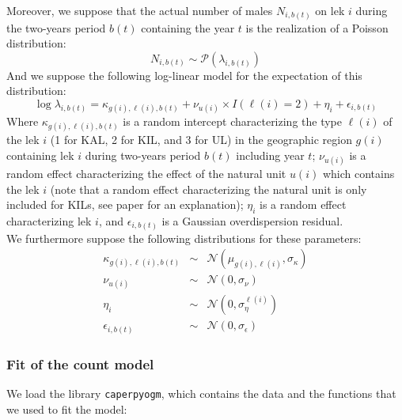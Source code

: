 \documentclass[a4paper]{article}
\newenvironment{Default Paragraph Font}{}{}
\begin{document}
Moreover, we suppose that the actual number of males $N_{i,b(t)}$ on
lek $i$ during the two-years period $b(t)$  containing the year $t$ is
the realization of a Poisson distribution:
\begin{equation}
  \label{eq:eqN}
  N_{i,b(t)}\sim \mathcal{P}(\lambda_{i,b(t)})
\end{equation}
And we suppose the following log-linear model for the expectation of
this distribution:
\begin{equation}
  \label{eq:eqlambda}
\log \lambda_{i,b(t)} = \kappa_{g(i),\ell(i),b(t)} + \nu_{u(i)}\times
I(\ell(i) =2) + \eta_i + \epsilon_{i,b(t)}
\end{equation}
Where $\kappa_{g(i),\ell(i),b(t)}$ is a random intercept
characterizing the type $\ell(i)$ of the lek $i$ (1 for KAL, 2 for
KIL, and 3 for UL) in the geographic region $g(i)$ containing lek $i$
during two-years period $b(t)$ including year $t$; $\nu_{u(i)}$ is a
random effect characterizing the effect of the natural unit $u(i)$
which contains the lek $i$ (note that a random effect characterizing
the natural unit is only included for KILs, see paper for an
explanation); $\eta_i$ is a random effect characterizing lek $i$, and
$\epsilon_{i,b(t)}$ is a Gaussian overdispersion residual.\\

We furthermore suppose the following distributions for these parameters:
\begin{eqnarray*}
\kappa_{g(i),\ell(i),b(t)} & \sim & \mathcal{N}(\mu_{g(i),\ell(i)},
  \sigma_{\kappa})\\
\nu_{u(i)} & \sim & \mathcal{N}(0,\sigma_\nu) \\ 
\eta_{i} & \sim & \mathcal{N}(0,\sigma_\eta^{\ell(i)})\\
\epsilon_{i,b(t)} & \sim & \mathcal{N}(0,\sigma_\epsilon)  
\end{eqnarray*}


\subsubsection{Fit of the count model}
\label{sec:fitmc}

We load the library \texttt{caperpyogm}, which contains the data and
the functions that we used to fit the model:
\end{document}
